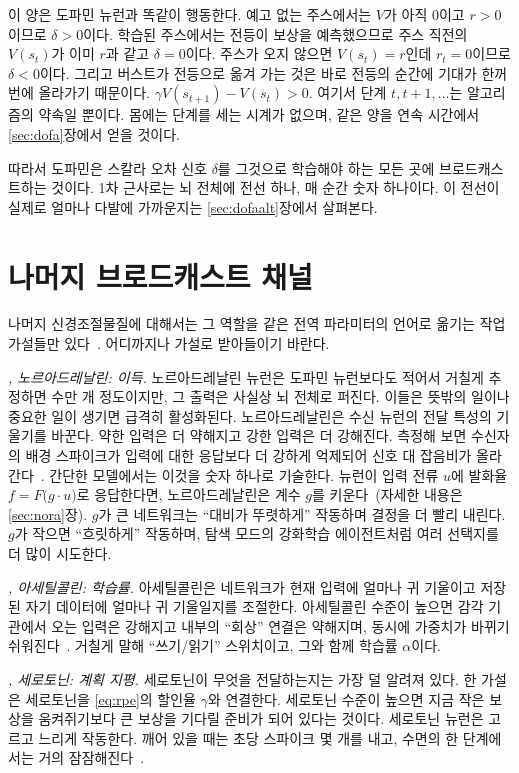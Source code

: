 이 양은 도파민 뉴런과 똑같이 행동한다. 예고 없는 주스에서는 $V$가 아직 0이고 $r>0$이므로 $\delta>0$이다. 학습된 주스에서는 전등이 보상을 예측했으므로 주스 직전의 $V(s_t)$가 이미 $r$과 같고 $\delta=0$이다. 주스가 오지 않으면 $V(s_t)=r$인데 $r_t=0$이므로 $\delta<0$이다. 그리고 버스트가 전등으로 옮겨 가는 것은 바로 전등의 순간에 기대가 한꺼번에 올라가기 때문이다. $\gamma V(s_{t+1})-V(s_t)>0$. 여기서 단계 $t,t+1,\dots$는 알고리즘의 약속일 뿐이다. 몸에는 단계를 세는 시계가 없으며, 같은 양을 연속 시간에서 \ref{sec:dofa}장에서 얻을 것이다.

따라서 도파민은 스칼라 오차 신호 $\delta$를 그것으로 학습해야 하는 모든 곳에 브로드캐스트하는 것이다. 1차 근사로는 뇌 전체에 전선 하나, 매 순간 숫자 하나이다. 이 전선이 실제로 얼마나 다발에 가까운지는 \ref{sec:dofaalt}장에서 살펴본다.

\section{나머지 브로드캐스트 채널}

나머지 신경조절물질에 대해서는 그 역할을 같은 전역 파라미터의 언어로 옮기는 작업 가설들만 있다~\cite{Doya2002}. 어디까지나 가설로 받아들이기 바란다.

\emph{, 노르아드레날린: 이득.} 노르아드레날린 뉴런은 도파민 뉴런보다도 적어서 거칠게 추정하면 수만 개 정도이지만, 그 출력은 사실상 뇌 전체로 퍼진다. 이들은 뜻밖의 일이나 중요한 일이 생기면 급격히 활성화된다. 노르아드레날린은 수신 뉴런의 전달 특성의 기울기를 바꾼다. 약한 입력은 더 약해지고 강한 입력은 더 강해진다. 측정해 보면 수신자의 배경 스파이크가 입력에 대한 응답보다 더 강하게 억제되어 신호 대 잡음비가 올라간다~\cite{Foote1975NE}. 간단한 모델에서는 이것을 숫자 하나로 기술한다. 뉴런이 입력 전류 $u$에 발화율 $f=F\bigl(g\cdot u\bigr)$로 응답한다면, 노르아드레날린은 계수 $g$를 키운다~\cite{AstonJones2005}(자세한 내용은 \ref{sec:nora}장). $g$가 큰 네트워크는 “대비가 뚜렷하게” 작동하며 결정을 더 빨리 내린다. $g$가 작으면 “흐릿하게” 작동하며, 탐색 모드의 강화학습 에이전트처럼 여러 선택지를 더 많이 시도한다.

\emph{, 아세틸콜린: 학습률.} 아세틸콜린은 네트워크가 현재 입력에 얼마나 귀 기울이고 저장된 자기 데이터에 얼마나 귀 기울일지를 조절한다. 아세틸콜린 수준이 높으면 감각 기관에서 오는 입력은 강해지고 내부의 “회상” 연결은 약해지며, 동시에 가중치가 바뀌기 쉬워진다~\cite{Hasselmo2006}. 거칠게 말해 “쓰기/읽기” 스위치이고, 그와 함께 학습률 $\alpha$이다.

\emph{, 세로토닌: 계획 지평.} 세로토닌이 무엇을 전달하는지는 가장 덜 알려져 있다. 한 가설은 세로토닌을 \eqref{eq:rpe}의 할인율 $\gamma$와 연결한다. 세로토닌 수준이 높으면 지금 작은 보상을 움켜쥐기보다 큰 보상을 기다릴 준비가 되어 있다는 것이다. 세로토닌 뉴런은 고르고 느리게 작동한다. 깨어 있을 때는 초당 스파이크 몇 개를 내고, 수면의 한 단계에서는 거의 잠잠해진다~\cite{JacobsAzmitia1992}.

